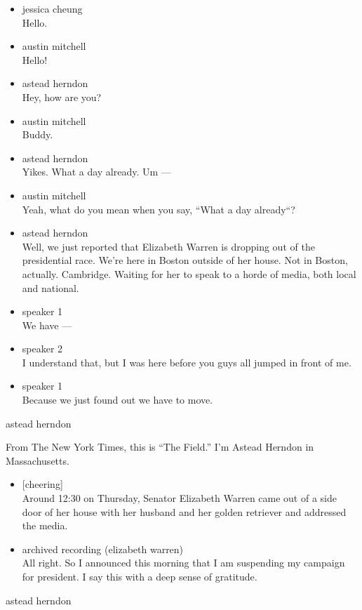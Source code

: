 \begin{itemize}
\item
  jessica cheung\\
  Hello.
\item
  austin mitchell\\
  Hello!
\item
  astead herndon\\
  Hey, how are you?
\item
  austin mitchell\\
  Buddy.
\item
  astead herndon\\
  Yikes. What a day already. Um ---
\item
  austin mitchell\\
  Yeah, what do you mean when you say, ``What a day already``?
\item
  astead herndon\\
  Well, we just reported that Elizabeth Warren is dropping out of the
  presidential race. We're here in Boston outside of her house. Not in
  Boston, actually. Cambridge. Waiting for her to speak to a horde of
  media, both local and national.
\item
  speaker 1\\
  We have ---
\item
  speaker 2\\
  I understand that, but I was here before you guys all jumped in front
  of me.
\item
  speaker 1\\
  Because we just found out we have to move.
\end{itemize}

astead herndon

From The New York Times, this is ``The Field.'' I'm Astead Herndon in
Massachusetts.

\begin{itemize}
\item
  {[}cheering{]}\\
  Around 12:30 on Thursday, Senator Elizabeth Warren came out of a side
  door of her house with her husband and her golden retriever and
  addressed the media.
\item
  archived recording (elizabeth warren)\\
  All right. So I announced this morning that I am suspending my
  campaign for president. I say this with a deep sense of gratitude.
\end{itemize}

astead herndon

